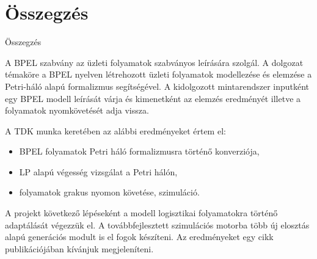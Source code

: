 \chapter{Összegzés}
Összegzés

A BPEL szabvány az üzleti folyamatok szabványos leírására szolgál.  A dolgozat témaköre a BPEL nyelven létrehozott üzleti folyamatok modellezése  és elemzése a Petri-háló alapú formalizmus segítségével. A kidolgozott mintarendszer inputként egy BPEL modell leírását várja és kimenetként az elemzés eredményét illetve a folyamatok nyomkövetését adja vissza.

A TDK munka keretében az alábbi eredményeket értem el:
\begin{itemize}
\item BPEL folyamatok Petri háló formalizmusra történő konverziója,
\item LP alapú végesség vizsgálat a Petri hálón,
\item folyamatok grakus nyomon követése, szimuláció.
\end{itemize}

A projekt következő lépéseként a modell logisztikai folyamatokra történő  adaptálását végezzük el. A továbbfejlesztett szimulációs motorba több új elosztás alapú generációs modult is el fogok készíteni. Az eredményeket egy cikk publikációjában kívánjuk megjeleníteni.
